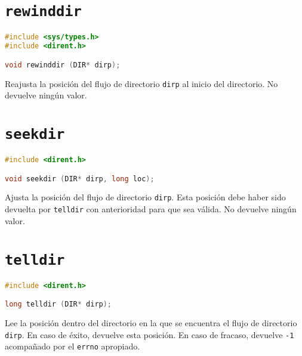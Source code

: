 \section{\texttt{rewinddir}}\label{rewinddir}

\begin{lstlisting}[language=C]
#include <sys/types.h>
#include <dirent.h>

void rewinddir (DIR* dirp);
\end{lstlisting}

Reajusta la posición del flujo de directorio \texttt{dirp} al inicio del directorio.
No devuelve ningún valor.

\section{\texttt{seekdir}}\label{seekdir}

\begin{lstlisting}[language=C]
#include <dirent.h>

void seekdir (DIR* dirp, long loc);
\end{lstlisting}

Ajusta la posición del flujo de directorio \texttt{dirp}.
Esta posición debe haber sido devuelta por \texttt{telldir} con anterioridad para que sea válida.
No devuelve ningún valor.

\section{\texttt{telldir}}\label{telldir}

\begin{lstlisting}[language=C]
#include <dirent.h>

long telldir (DIR* dirp);
\end{lstlisting}

Lee la posición dentro del directorio en la que se encuentra el flujo de directorio \texttt{dirp}.
En caso de éxito, devuelve esta posición.
En caso de fracaso, devuelve \texttt{-1} acompañado por el \texttt{errno} apropiado.

